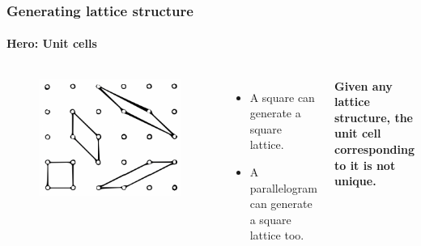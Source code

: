 \documentclass{beamer}
\begin{document}
    \begin{frame}
        \frametitle{Generating lattice structure}
        \framesubtitle{Hero: Unit cells}
        \begin{columns}
            
                \begin{figure}
                    \centering
                    \includegraphics[scale=0.20]{unit.png}
                \end{figure}
                \begin{itemize}
                    \item<1-> A square can generate a square lattice. \pause
                    \item<2-> A parallelogram can generate a square lattice too. \pause
                \end{itemize}
                    
    
                    \textbf{Given any lattice structure, the unit cell corresponding to it is not unique.}
        \end{columns}
    \end{frame}
\end{document}
